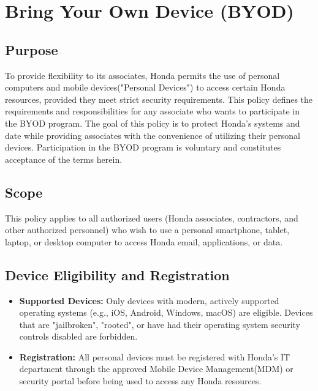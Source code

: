 \chapter{Bring Your Own Device (BYOD)}
\pagestyle{fancy}

\fancyhf{}

\fancyfoot[C]{\thepage}

\renewcommand{\headrulewidth}{0pt}
\renewcommand{\footrulewidth}{0pt}

\section{Purpose}
To provide flexibility to its associates, Honda permits the use of personal computers and mobile devices("Personal Devices") to access certain Honda resources, provided they meet strict security requirements.  This policy defines the requirements and responsibilities for any associate who wants to participate in the BYOD program.  The goal of this policy is to protect Honda's systems and date while providing associates with the convenience of utilizing their personal devices.  Participation in the BYOD program is voluntary and constitutes acceptance of the terms herein.

\section{Scope}
This policy applies to all authorized users (Honda associates, contractors, and other authorized personnel) who wish to use a personal smartphone, tablet, laptop, or desktop computer to access Honda email, applications, or data.

\section{Device Eligibility and Registration}

\begin{itemize}
    \item \textbf{Supported Devices:} Only devices with modern, actively supported operating systems (e.g., iOS, Android, Windows, macOS) are eligible.  Devices that are "jailbroken", "rooted", or have had their operating system security controls disabled are forbidden.
    \item \textbf{Registration:} All personal devices must be registered with Honda's IT department through the approved Mobile Device Management(MDM) or security portal before being used to access any Honda resources.
\end{itemize}


